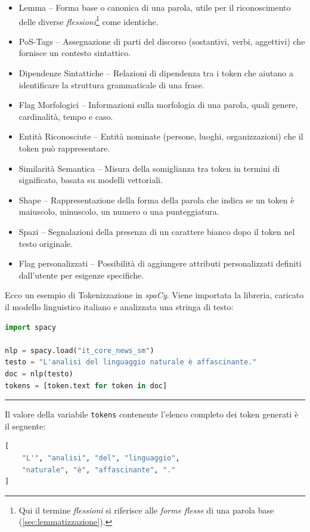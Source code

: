 \documentclass[12pt]{report}
\newcommand{\spacy}{\textsl{spaCy}\xspace}
\begin{document}
\begin{itemize}
    \item \textsf{Lemma} -- Forma base o canonica di una parola, utile per il riconoscimento delle diverse \textit{flessioni}\footnote{Qui il termine \textit{flessioni} si riferisce alle \textit{forme flesse} di una parola base (\cref{sec:lemmatizzazione}).} come identiche.
\item \textsf{PoS-Tags} -- Assegnazione di parti del discorso (sostantivi, verbi, aggettivi) che fornisce un contesto sintattico.
\item \textsf{Dipendenze Sintattiche} -- Relazioni di dipendenza tra i token che aiutano a identificare la struttura grammaticale di una frase.
\item \textsf{Flag Morfologici} -- Informazioni sulla morfologia di una parola, quali genere, cardinalità, tempo e caso.
\item \textsf{Entità Riconosciute} -- Entità nominate (persone, luoghi, organizzazioni) che il token può rappresentare.
\item \textsf{Similarità Semantica} -- Misura della somiglianza tra token in termini di significato, basata su modelli vettoriali.
\item \textsf{Shape} -- Rappresentazione della forma della parola che indica se un token è maiuscolo, minuscolo, un numero o una punteggiatura.
\item \textsf{Spazi} -- Segnalazioni della presenza di un carattere bianco dopo il token nel testo originale.
\item \textsf{Flag personalizzati} -- Possibilità di aggiungere attributi personalizzati definiti dall'utente per esigenze specifiche.
\end{itemize}


\begin{mdframed}
\small
Ecco un esempio di Tokenizzazione in \spacy. Viene importata la libreria, caricato il modello linguistico italiano e analizzata una stringa di testo:

\begin{lstlisting}[language=Python]
import spacy

nlp = spacy.load("it_core_news_sm")
testo = "L'analisi del linguaggio naturale è affascinante."
doc = nlp(testo)
tokens = [token.text for token in doc]
\end{lstlisting}

{\centering \rule{0.5\linewidth}{0.1pt} \par\vspace{0.25cm}}

\noindent Il valore della variabile \texttt{tokens} contenente l'elenco completo dei token generati è il seguente:

\begin{lstlisting}[language=Python]
[
    "L'", "analisi", "del", "linguaggio",
    "naturale", "è", "affascinante", "."
]
\end{lstlisting}
\end{mdframed}
\end{document}
